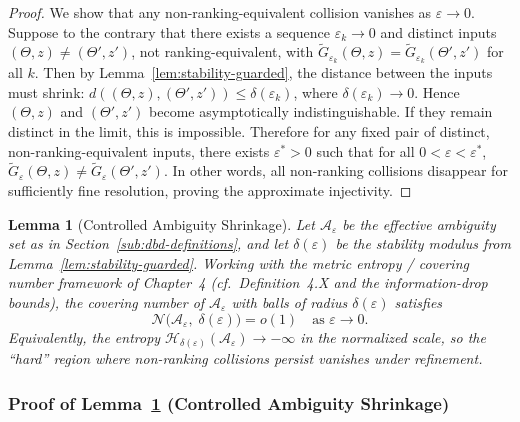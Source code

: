 \documentclass[12pt]{article}
\theoremstyle{definition}
\theoremstyle{plain}
\newtheorem{lemma}{Lemma}[section]
\begin{document}
\begin{proof}
We show that any non-ranking-equivalent collision vanishes as \(\varepsilon\to0\). Suppose to the contrary that there exists a sequence \(\varepsilon_k\to0\) and distinct inputs \((\Theta,z)\neq(\Theta',z')\), not ranking-equivalent, with \(\tilde G_{\varepsilon_k}(\Theta,z)=\tilde G_{\varepsilon_k}(\Theta',z')\) for all \(k\). Then by Lemma~\ref{lem:stability-guarded}, the distance between the inputs must shrink: \(d((\Theta,z),(\Theta',z'))\le \delta(\varepsilon_k)\), where \(\delta(\varepsilon_k)\to0\). Hence \((\Theta,z)\) and \((\Theta',z')\) become asymptotically indistinguishable. If they remain distinct in the limit, this is impossible. Therefore for any fixed pair of distinct, non-ranking-equivalent inputs, there exists \(\varepsilon^*>0\) such that for all \(0<\varepsilon<\varepsilon^*\), \(\tilde G_\varepsilon(\Theta,z)\neq \tilde G_\varepsilon(\Theta',z')\). In other words, all non-ranking collisions disappear for sufficiently fine resolution, proving the approximate injectivity.
\end{proof}


\begin{lemma}[Controlled Ambiguity Shrinkage]
\label{lem:ambiguity-shrink}
Let \(\mathcal A_\varepsilon\) be the effective ambiguity set as in Section~\ref{sub:dbd-definitions}, and let \(\delta(\varepsilon)\) be the stability modulus from Lemma~\ref{lem:stability-guarded}.  Working with the metric entropy / covering number framework of Chapter~4 (cf.\ Definition~4.X and the information-drop bounds), the covering number of \(\mathcal A_\varepsilon\) with balls of radius \(\delta(\varepsilon)\) satisfies
\[
\mathcal N\bigl(\mathcal A_\varepsilon,\; \delta(\varepsilon)\bigr)
= o(1)
\quad\text{as }\varepsilon\to0.
\]
Equivalently, the entropy \(\mathcal H_{\delta(\varepsilon)}(\mathcal A_\varepsilon)\to -\infty\) in the normalized scale, so the “hard” region where non-ranking collisions persist vanishes under refinement.
\end{lemma}


\subsubsection*{Proof of Lemma~\ref{lem:ambiguity-shrink} (Controlled Ambiguity Shrinkage)}
\label{proof:ambiguity-shrink}
\end{document}
